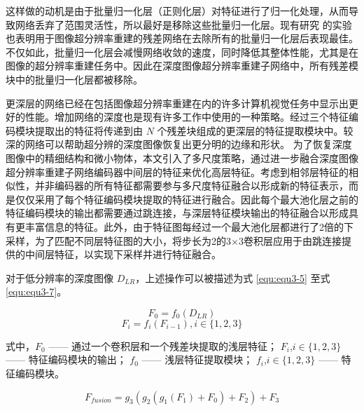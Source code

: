 这样做的动机是由于批量归一化层（正则化层）对特征进行了归一化处理，从而导致网络丢弃了范围灵活性，所以最好是移除这些批量归一化层。现有研究 \cite{DBLP:conf/cvpr/LimSKNL17} 的实验也表明用于图像超分辨率重建的残差网络在去除所有的批量归一化层后表现最佳。不仅如此，批量归一化层会减慢网络收敛的速度，同时降低其整体性能，尤其是在图像的超分辨率重建任务中。因此在深度图像超分辨率重建子网络中，所有残差模块中的批量归一化层都被移除。

更深层的网络已经在包括图像超分辨率重建在内的许多计算机视觉任务中显示出更好的性能。增加网络的深度也是现有许多工作中使用的一种策略。经过三个特征编码模块提取出的特征将传递到由 $N$ 个残差块组成的更深层的特征提取模块中。较深的网络可以帮助超分辨的深度图像恢复出更分明的边缘和形状。
\newpage
为了恢复深度图像中的精细结构和微小物体，本文引入了多尺度策略，通过进一步融合深度图像超分辨率重建子网络编码器中间层的特征来优化高层特征。考虑到相邻层特征的相似性，并非编码器的所有特征都需要参与多尺度特征融合以形成新的特征表示，而是仅仅采用了每个特征编码模块提取的特征进行融合。因此每个最大池化层之前的特征编码模块的输出都需要通过跳连接，与深层特征模块输出的特征融合以形成具有更丰富信息的特征。此外，由于特征图每经过一个最大池化层都进行了2倍的下采样，为了匹配不同层特征图的大小，将步长为2的3×3卷积层应用于由跳连接提供的中间层特征，以实现下采样并进行特征融合。

对于低分辨率的深度图像 $D_{LR}$，上述操作可以被描述为式 \ref{equ:equ3-5} 至式 \ref{equ:equ3-7}。

\vspace{-0.4cm}
\begin{equation}
	F_0=f_0\left(D_{LR}\right)
	\label{equ:equ3-5}
\end{equation}
\vspace{-0.8cm}
\begin{equation}
	F_i=f_i\left(F_{i-1}\right),i\in\{1,2,3\}
	\label{equ:equ3-6}
\end{equation}

\noindent 式中，$F_0$ —— 通过一个卷积层和一个残差块提取的浅层特征；\newline
\indent\quad $F_i$,$i\in\{1,2,3\}$ —— 特征编码模块的输出；\newline
\indent\quad $f_0$ —— 浅层特征提取模块；\newline
\indent\quad $f_i$,$i\in\{1,2,3\}$ —— 特征编码模块。

\vspace{-0.4cm}
\begin{equation}
	F_{fusion}=g_3\left(g_2\left(g_1\left(F_1\right)+F_0\right)+F_2\right)+F_3
	\label{equ:equ3-7}
\end{equation}

